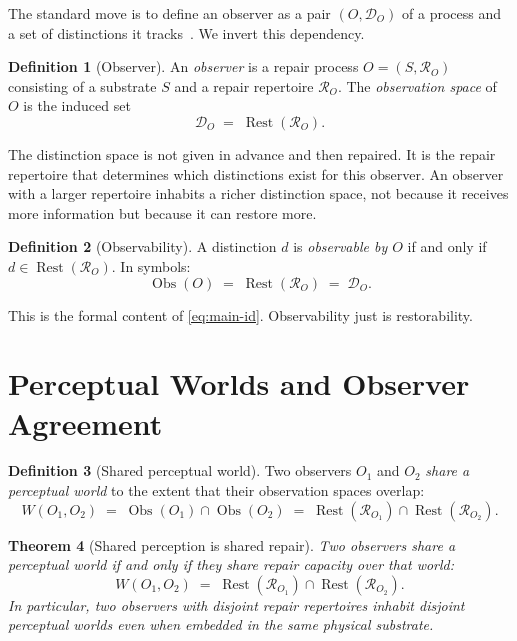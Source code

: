 \documentclass[12pt, oneside]{article}
\theoremstyle{plain}
\newtheorem{theorem}{Theorem}[section]
\theoremstyle{definition}
\newtheorem{definition}[theorem]{Definition}
\theoremstyle{remark}
\theoremstyle{definition}
\DeclareMathOperator{\Obs}{Obs}
\DeclareMathOperator{\Rest}{Rest}
\newcommand{\DO}{\mathcal{D}_O}
\begin{document}
The standard move is to define an observer as a pair $(O, \DO)$ of a
process and a set of distinctions it tracks~\cite{Ashby1956,ConantAshby1970}.
We invert this dependency.

\begin{definition}[Observer]
  An \emph{observer} is a repair process $O = (S, \mathcal{R}_O)$
  consisting of a substrate $S$ and a repair repertoire
  $\mathcal{R}_O$.
  The \emph{observation space} of $O$ is the induced set
  \[
    \DO \;=\; \Rest(\mathcal{R}_O).
  \]
\end{definition}

The distinction space is not given in advance and then repaired.
It is the repair repertoire that determines which distinctions exist
for this observer.
An observer with a larger repertoire inhabits a richer distinction
space, not because it receives more information but because it can
restore more.

\begin{definition}[Observability]
  A distinction $d$ is \emph{observable by $O$} if and only if
  $d \in \Rest(\mathcal{R}_O)$.
  In symbols:
  \[
    \Obs(O) \;=\; \Rest(\mathcal{R}_O) \;=\; \DO.
  \]
\end{definition}

This is the formal content of \eqref{eq:main-id}.
Observability just is restorability.


\section{Perceptual Worlds and Observer Agreement}
\label{sec:worlds}

\begin{definition}[Shared perceptual world]
  Two observers $O_1$ and $O_2$ \emph{share a perceptual world} to
  the extent that their observation spaces overlap:
  \[
    W(O_1, O_2)
    \;=\;
    \Obs(O_1) \cap \Obs(O_2)
    \;=\;
    \Rest(\mathcal{R}_{O_1}) \cap \Rest(\mathcal{R}_{O_2}).
  \]
\end{definition}

\begin{theorem}[Shared perception is shared repair]
  Two observers share a perceptual world if and only if they share
  repair capacity over that world:
  \[
    W(O_1, O_2)
    \;=\;
    \Rest(\mathcal{R}_{O_1}) \cap \Rest(\mathcal{R}_{O_2}).
  \]
  In particular, two observers with disjoint repair repertoires
  inhabit disjoint perceptual worlds even when embedded in the same
  physical substrate.
  \label{thm:shared-world}
\end{theorem}
\end{document}

